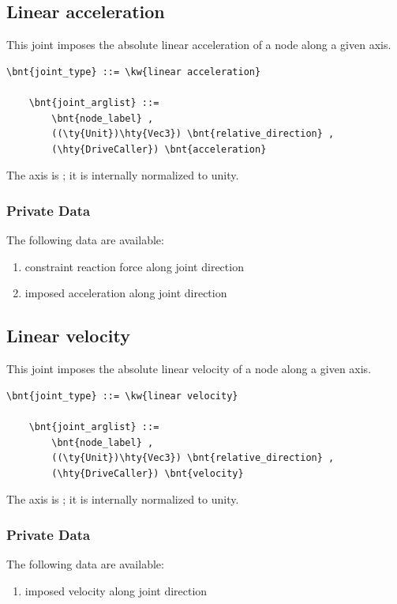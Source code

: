 \subsection{Linear acceleration}
This joint imposes the absolute linear acceleration of a node
along a given axis.
\begin{Verbatim}[commandchars=\\\{\}]
    \bnt{joint_type} ::= \kw{linear acceleration}

    \bnt{joint_arglist} ::=
        \bnt{node_label} ,
        ((\ty{Unit})\hty{Vec3}) \bnt{relative_direction} , 
        (\hty{DriveCaller}) \bnt{acceleration}
\end{Verbatim}
The axis is ; it is internally normalized to unity.

\subsubsection{Private Data}
The following data are available:
\begin{enumerate}
\item {} constraint reaction force along joint direction
\item {} imposed acceleration along joint direction
\end{enumerate}

\subsection{Linear velocity}
This joint imposes the absolute linear velocity of a node
along a given axis.
\begin{Verbatim}[commandchars=\\\{\}]
    \bnt{joint_type} ::= \kw{linear velocity}

    \bnt{joint_arglist} ::=
        \bnt{node_label} ,
        ((\ty{Unit})\hty{Vec3}) \bnt{relative_direction} , 
        (\hty{DriveCaller}) \bnt{velocity}
\end{Verbatim}
The axis is ; it is internally normalized to unity.

\subsubsection{Private Data}
The following data are available:
\begin{enumerate}
\item {} imposed velocity along joint direction
\end{enumerate}



